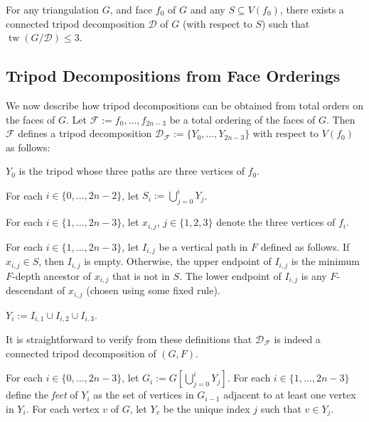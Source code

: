 \documentclass{patmorin}
\DeclareMathOperator{\tw}{tw}
\begin{document}
\begin{thm}\label{tripod_decomposition}
  For any triangulation $G$, and face $f_0$ of $G$ and any $S\subseteq V(f_0)$, there exists a connected tripod decomposition $\mathcal{D}$ of $G$ (with respect to $S$) such that $\tw(G/\mathcal{D})\le 3$.
\end{thm}


\subsection{Tripod Decompositions from Face Orderings}

We now describe how tripod decompositions can be obtained from total orders on the faces of $G$.  Let $\mathcal{F}:=f_0,\ldots,f_{2n-3}$ be a total ordering of the faces of $G$.  Then $\mathcal{F}$ defines a tripod decomposition $\mathcal{D}_\mathcal{F}:=\{Y_0,\ldots,Y_{2n-3}\}$ with respect to $V(f_0)$ as follows:
\begin{compactenum}
  \item $Y_0$ is the tripod whose three paths are three vertices of $f_0$.
  \item For each $i\in\{0,\ldots,2n-2\}$, let $S_i:=\bigcup_{j=0}^i Y_j$.
  \item For each $i\in\{1,\ldots,2n-3\}$, let $x_{i,j}$, $j\in\{1,2,3\}$ denote the three vertices of $f_i$.
  \item For each $i\in\{1,\ldots,2n-3\}$, let $I_{i,j}$ be a vertical path in $F$ defined as follows.  If $x_{i,j}\in S$, then $I_{i,j}$ is empty.  Otherwise, the upper endpoint of $I_{i,j}$ is the minimum $F$-depth ancestor of $x_{i,j}$ that is not in $S$. The lower endpoint of $I_{i,j}$ is any $F$-descendant of $x_{i,j}$ (chosen using some fixed rule).
  \item $Y_i:=I_{i,1}\cup I_{i,2}\cup I_{i,3}$.
\end{compactenum}
It is straightforward to verify from these definitions that $\mathcal{D}_\mathcal{F}$ is indeed a connected tripod decomposition of $(G,F)$.

For each $i\in\{0,\ldots,2n-3\}$, let $G_i:=G[\bigcup_{j=0}^iY_j]$. For each $i\in\{1,\ldots,2n-3\}$ define the \emph{feet} of $Y_i$ as the set of vertices in $G_{i-1}$ adjacent to at least one vertex in $Y_i$.  For each vertex $v$ of $G$, let $Y_v$ be the unique index $j$ such that $v\in Y_j$.
\end{document}
